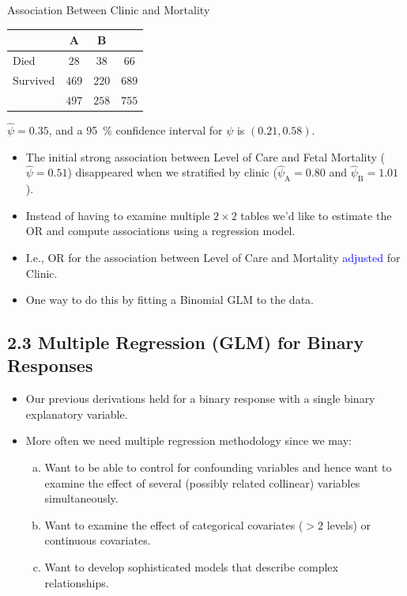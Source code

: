 \documentclass[oneside]{book}\usepackage[]{graphicx}\usepackage[svgnames]{xcolor}
\begin{document}
\begin{Example}{Association Between Clinic and Mortality}
    \begin{center}
        \begin{NiceTabular}{l|cc|c}
            & A                            & B &                                         \\
            \midrule
            Died & $ 28 $                            & $ 38 $                 & $ 66 $         \\
            Survived   & $ 469 $                            & $ 220 $                 & $ 689 $         \\
            \midrule
            & $ 497 $                    & $ 258 $ & $ 755 $
        \end{NiceTabular}
    \end{center}
    $ \hat{\psi}=0.35 $, and a \qty{95}{\percent} confidence interval for $ \psi $ is $ (0.21,0.58) $.
\end{Example}
\begin{itemize}
    \item The initial strong association between Level of Care and Fetal Mortality ($ \hat{\psi}=0.51 $)
          disappeared when we stratified by clinic ($ \hat{\psi}_\text{A}=0.80 $ and $ \hat{\psi}_\text{B}=1.01 $).
    \item Instead of having to examine multiple $ 2\times 2 $ tables we'd like to estimate the OR
          and compute associations using a regression model.
    \item I.e., OR for the association between Level of Care and Mortality \textcolor{Blue}{adjusted} for Clinic.
    \item One way to do this by fitting a Binomial GLM to the data.
\end{itemize}
\subsection*{2.3 Multiple Regression (GLM) for Binary Responses}
\begin{itemize}
    \item Our previous derivations held for a binary response with a single binary
          explanatory variable.
    \item More often we need multiple regression methodology since we may:
          \begin{enumerate}[a.]
              \item Want to be able to control for confounding variables and hence want to examine the
                    effect of several (possibly related collinear) variables simultaneously.
              \item Want to examine the effect of categorical covariates ($ >2 $ levels) or continuous
                    covariates.
              \item Want to develop sophisticated models that describe complex relationships.
          \end{enumerate}
\end{itemize}
\end{document}
